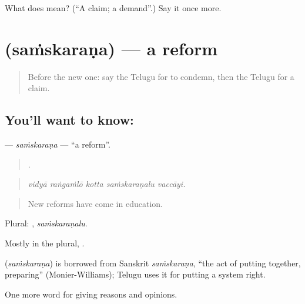 \begin{tcolorbox}[breakable,colback=teal!4,colframe=teal!35!black,title={Before you move on}]
What does  mean? (\textquotedblleft{}A claim; a demand\textquotedblright{}.) Say it once more.
\end{tcolorbox}
\section[\texorpdfstring{\te{సంస్కరణ} (saṁskaraṇa)}{సంస్కరణ (saṁskaraṇa)}]{ (saṁskaraṇa) — a reform}

\label{lesson:TE-C407-samskarana}



\begin{quote}
Before the new one: say the Telugu for to condemn, then the Telugu for a claim.
\end{quote}

\subsection*{You'll want to know: }
\textbf{} — \emph{saṁskaraṇa} — \textquotedblleft{}a reform\textquotedblright{}.

\begin{quote}
    .
\end{quote}

\begin{quote}
\emph{vidyā raṅgaṁlō kotta saṁskaraṇalu vaccāyi.}
\end{quote}

\begin{quote}
New reforms have come in education.
\end{quote}

Plural: , \emph{saṁskaraṇalu}.

Mostly in the plural, .

\begin{cousinweb}
\textbf{} (\emph{saṁskaraṇa}) is borrowed from Sanskrit \emph{saṁskaraṇa}, \textquotedblleft{}the act of putting together, preparing\textquotedblright{} (Monier-Williams); Telugu uses it for putting a system right.
\end{cousinweb}

\begin{grammarlens}[title={What you've built}]
One more word for giving reasons and opinions.
\end{grammarlens}

